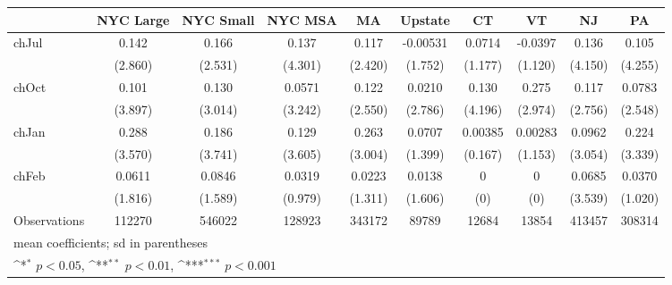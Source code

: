 {
\def\sym#1{\ifmmode^{#1}\else\(^{#1}\)\fi}
\begin{tabular}{l*{9}{c}}
\hline\hline
                    &\multicolumn{1}{c}{NYC Large}&\multicolumn{1}{c}{NYC Small}&\multicolumn{1}{c}{NYC MSA}&\multicolumn{1}{c}{MA}&\multicolumn{1}{c}{Upstate}&\multicolumn{1}{c}{CT}&\multicolumn{1}{c}{VT}&\multicolumn{1}{c}{NJ}&\multicolumn{1}{c}{PA}\\
\hline
chJul               &       0.142         &       0.166         &       0.137         &       0.117         &    -0.00531         &      0.0714         &     -0.0397         &       0.136         &       0.105         \\
                    &     (2.860)         &     (2.531)         &     (4.301)         &     (2.420)         &     (1.752)         &     (1.177)         &     (1.120)         &     (4.150)         &     (4.255)         \\
[1em]
chOct               &       0.101         &       0.130         &      0.0571         &       0.122         &      0.0210         &       0.130         &       0.275         &       0.117         &      0.0783         \\
                    &     (3.897)         &     (3.014)         &     (3.242)         &     (2.550)         &     (2.786)         &     (4.196)         &     (2.974)         &     (2.756)         &     (2.548)         \\
[1em]
chJan               &       0.288         &       0.186         &       0.129         &       0.263         &      0.0707         &     0.00385         &     0.00283         &      0.0962         &       0.224         \\
                    &     (3.570)         &     (3.741)         &     (3.605)         &     (3.004)         &     (1.399)         &     (0.167)         &     (1.153)         &     (3.054)         &     (3.339)         \\
[1em]
chFeb               &      0.0611         &      0.0846         &      0.0319         &      0.0223         &      0.0138         &           0         &           0         &      0.0685         &      0.0370         \\
                    &     (1.816)         &     (1.589)         &     (0.979)         &     (1.311)         &     (1.606)         &         (0)         &         (0)         &     (3.539)         &     (1.020)         \\
\hline
Observations        &      112270         &      546022         &      128923         &      343172         &       89789         &       12684         &       13854         &      413457         &      308314         \\
\hline\hline
\multicolumn{10}{l}{\footnotesize mean coefficients; sd in parentheses}\\
\multicolumn{10}{l}{\footnotesize \sym{*} \(p<0.05\), \sym{**} \(p<0.01\), \sym{***} \(p<0.001\)}\\
\end{tabular}
}
